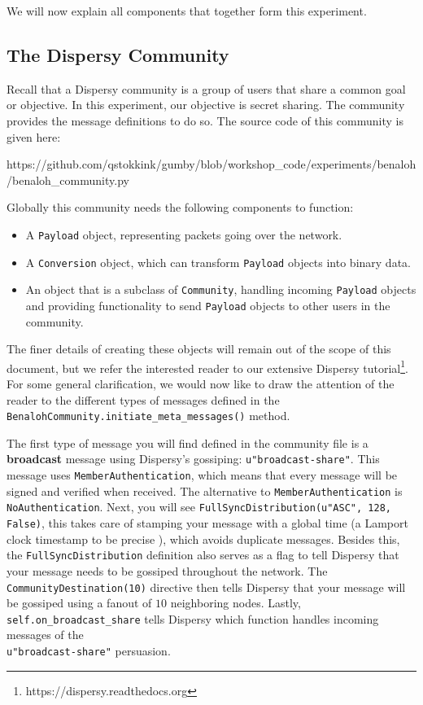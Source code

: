 \documentclass{article}
\begin{document}
\noindent We will now explain all components that together form this experiment.

\subsection{The Dispersy Community}
\label{sec:dispersy_community}
Recall that a Dispersy community is a group of users that share a common goal or objective. In this experiment, our objective is secret sharing. The community provides the message definitions to do so.
The source code of this community is given here:

https://github.com/qstokkink/gumby/blob/workshop\_code/experiments/benaloh/benaloh\_community.py

\vspace{\baselineskip}
\noindent Globally this community needs the following components to function:

\begin{itemize}
\item A \texttt{Payload} object, representing packets going over the network.
\item A \texttt{Conversion} object, which can transform \texttt{Payload} objects into binary data.
\item An object that is a subclass of \texttt{Community}, handling incoming \texttt{Payload} objects and providing functionality to send \texttt{Payload} objects to other users in the community.
\end{itemize}

\noindent The finer details of creating these objects will remain out of the scope of this document, but we refer the interested reader to our extensive Dispersy tutorial\footnote{https://dispersy.readthedocs.org}.
For some general clarification, we would now like to draw the attention of the reader to the different types of messages defined in the \\\texttt{BenalohCommunity.initiate\_meta\_messages()} method.

The first type of message you will find defined in the community file is a \textbf{broadcast} message using Dispersy's gossiping: \texttt{u"broadcast-share"}.
This message uses \texttt{MemberAuthentication}, which means that every message will be signed  and verified when received.
The alternative to \texttt{MemberAuthentication} is \texttt{NoAuthentication}.
Next, you will see \texttt{FullSyncDistribution(u"ASC", 128, False)}, this takes care of stamping your message with a global time (a Lamport clock timestamp to be precise \cite{lamport1978time}), which avoids duplicate messages.
Besides this, the \texttt{FullSyncDistribution} definition also serves as a flag to tell Dispersy that your message needs to be gossiped throughout the network.
The \texttt{CommunityDestination(10)} directive then tells Dispersy that your message will be gossiped using a fanout of $10$ neighboring nodes.
Lastly, \texttt{self.on\_broadcast\_share} tells Dispersy which function handles incoming messages of the \\\texttt{u"broadcast-share"} persuasion.
\end{document}
